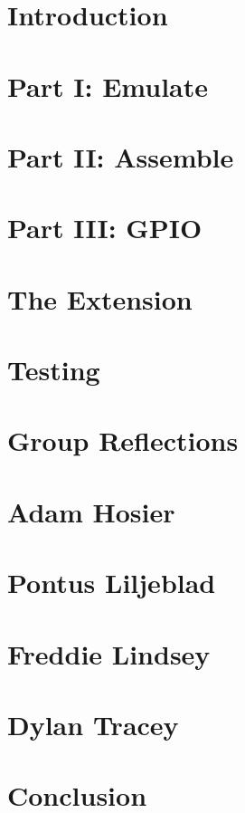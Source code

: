 \documentclass[11pt]{article}
\begin{document}


\maketitle

\section{Introduction}



\section{Part I: Emulate}



\section{Part II: Assemble}
  


\section{Part III: GPIO}


  
\section{The Extension}



\section{Testing}



\section{Group Reflections}



\section{Adam Hosier}



\section{Pontus Liljeblad}



\section{Freddie Lindsey}



\section{Dylan Tracey}



\section{Conclusion}


\end{document}
